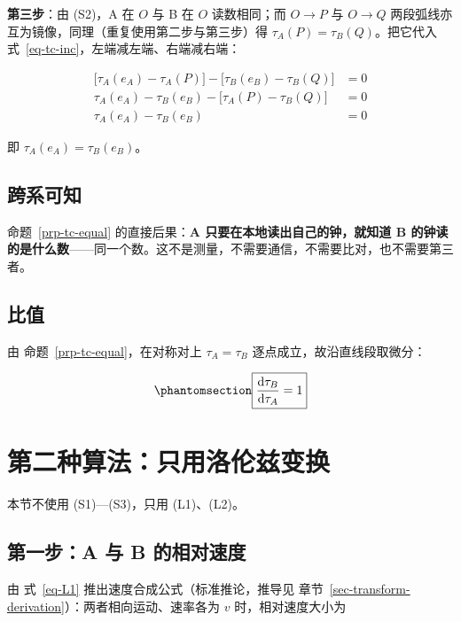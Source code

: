 \documentclass[
  chinese,
  a4paper,
  UTF8,
  12pt,
  oneside,
  openany]{ctexbook}
\theoremstyle{plain}
\theoremstyle{plain}
\theoremstyle{plain}
\theoremstyle{definition}
\theoremstyle{plain}
\theoremstyle{plain}
\theoremstyle{remark}
\begin{document}
\textbf{第三步}：由 (S2)，A 在 \(O\) 与 B 在 \(O\) 读数相同；而
\(O\to P\) 与 \(O\to Q\)
两段弧线亦互为镜像，同理（重复使用第二步与第三步）得
\(\tau_A(P)=\tau_B(Q)\)。把它代入
式~\ref{eq-tc-inc}，左端减左端、右端减右端：

\[
\begin{aligned}
\bigl[\tau_A(e_A)-\tau_A(P)\bigr]-\bigl[\tau_B(e_B)-\tau_B(Q)\bigr]&=0\\[4pt]
\tau_A(e_A)-\tau_B(e_B)-\bigl[\tau_A(P)-\tau_B(Q)\bigr]&=0\\[4pt]
\tau_A(e_A)-\tau_B(e_B)&=0
\end{aligned}
\]

即 \(\tau_A(e_A)=\tau_B(e_B)\)。

\subsection{跨系可知}\label{ux8de8ux7cfbux53efux77e5}

命题~\ref{prp-tc-equal} 的直接后果：\textbf{A
只要在本地读出自己的钟，就知道 B
的钟读的是什么数}------同一个数。这不是测量，不需要通信，不需要比对，也不需要第三者。

\subsection{比值}\label{ux6bd4ux503c}

由 命题~\ref{prp-tc-equal}，在对称对上 \(\tau_A=\tau_B\)
逐点成立，故沿直线段取微分：

\begin{equation}\protect\phantomsection\label{eq-tc-ratio-S}{
\boxed{\dfrac{\mathrm{d}\tau_B}{\mathrm{d}\tau_A}=1}
}\end{equation}

\section{第二种算法：只用洛伦兹变换}\label{sec-tc-lorentz}

本节不使用 (S1)---(S3)，只用 (L1)、(L2)。

\subsection{第一步：A 与 B
的相对速度}\label{ux7b2cux4e00ux6b65a-ux4e0e-b-ux7684ux76f8ux5bf9ux901fux5ea6}

由 式~\ref{eq-L1} 推出速度合成公式（标准推论，推导见
章节~\ref{sec-transform-derivation}）：两者相向运动、速率各为 \(v\)
时，相对速度大小为
\end{document}
